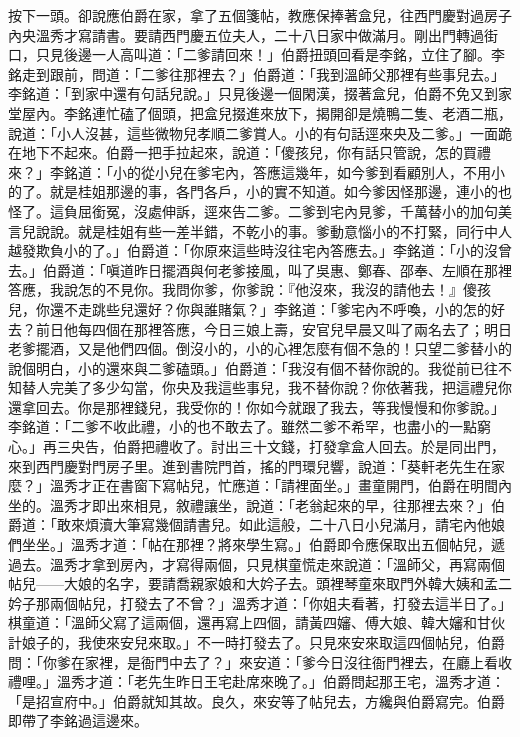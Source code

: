按下一頭。卻說應伯爵在家，拿了五個箋帖，教應保捧著盒兒，往西門慶對過房子內央溫秀才寫請書。要請西門慶五位夫人，二十八日家中做滿月。剛出門轉過街口，只見後邊一人高叫道：「二爹請回來！」伯爵扭頭回看是李銘，立住了腳。李銘走到跟前，問道：「二爹往那裡去？」伯爵道：「我到溫師父那裡有些事兒去。」李銘道：「到家中還有句話兒說。」只見後邊一個閑漢，掇著盒兒，伯爵不免又到家堂屋內。李銘連忙磕了個頭，把盒兒掇進來放下，揭開卻是燒鴨二隻、老酒二瓶，說道：「小人沒甚，這些微物兒孝順二爹賞人。小的有句話逕來央及二爹。」一面跪在地下不起來。伯爵一把手拉起來，說道：「傻孩兒，你有話只管說，怎的買禮來？」李銘道：「小的從小兒在爹宅內，答應這幾年，如今爹到看顧別人，不用小的了。就是桂姐那邊的事，各門各戶，小的實不知道。如今爹因怪那邊，連小的也怪了。這負屈銜冤，沒處伸訴，逕來告二爹。二爹到宅內見爹，千萬替小的加句美言兒說說。就是桂姐有些一差半錯，不乾小的事。爹動意惱小的不打緊，同行中人越發欺負小的了。」伯爵道：「你原來這些時沒往宅內答應去。」李銘道：「小的沒曾去。」伯爵道：「嗔道昨日擺酒與何老爹接風，叫了吳惠、鄭春、邵奉、左順在那裡答應，我說怎的不見你。我問你爹，你爹說：『他沒來，我沒的請他去！』傻孩兒，你還不走跳些兒還好？你與誰賭氣？」李銘道：「爹宅內不呼喚，小的怎的好去？前日他每四個在那裡答應，今日三娘上壽，安官兒早晨又叫了兩名去了；明日老爹擺酒，又是他們四個。倒沒小的，小的心裡怎麼有個不急的！只望二爹替小的說個明白，小的還來與二爹磕頭。」伯爵道：「我沒有個不替你說的。我從前已往不知替人完美了多少勾當，你央及我這些事兒，我不替你說？你依著我，把這禮兒你還拿回去。你是那裡錢兒，我受你的！你如今就跟了我去，等我慢慢和你爹說。」李銘道：「二爹不收此禮，小的也不敢去了。雖然二爹不希罕，也盡小的一點窮心。」再三央告，伯爵把禮收了。討出三十文錢，打發拿盒人回去。於是同出門，來到西門慶對門房子里。進到書院門首，搖的門環兒響，說道：「葵軒老先生在家麼？」溫秀才正在書窗下寫帖兒，忙應道：「請裡面坐。」畫童開門，伯爵在明間內坐的。溫秀才即出來相見，敘禮讓坐，說道：「老翁起來的早，往那裡去來？」伯爵道：「敢來煩瀆大筆寫幾個請書兒。如此這般，二十八日小兒滿月，請宅內他娘們坐坐。」溫秀才道：「帖在那裡？將來學生寫。」伯爵即令應保取出五個帖兒，遞過去。溫秀才拿到房內，才寫得兩個，只見棋童慌走來說道：「溫師父，再寫兩個帖兒——大娘的名字，要請喬親家娘和大妗子去。頭裡琴童來取門外韓大姨和孟二妗子那兩個帖兒，打發去了不曾？」溫秀才道：「你姐夫看著，打發去這半日了。」棋童道：「溫師父寫了這兩個，還再寫上四個，請黃四嬸、傅大娘、韓大嬸和甘伙計娘子的，我使來安兒來取。」不一時打發去了。只見來安來取這四個帖兒，伯爵問：「你爹在家裡，是衙門中去了？」來安道：「爹今日沒往衙門裡去，在廳上看收禮哩。」溫秀才道：「老先生昨日王宅赴席來晚了。」伯爵問起那王宅，溫秀才道：「是招宣府中。」伯爵就知其故。良久，來安等了帖兒去，方纔與伯爵寫完。伯爵即帶了李銘過這邊來。

